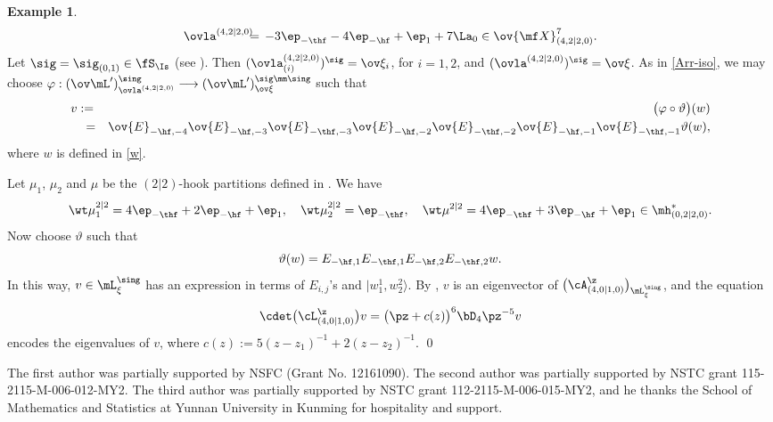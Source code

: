 \documentclass[11pt, reqno]{amsart}
\theoremstyle{definition}
\newtheorem{ex}[thm]{Example}
\theoremstyle{remark}
\numberwithin{equation}{section}
\begin{document}
\begin{ex}
\begin{eqnarray*}
\ovla^{(4,2|2,0)} \hspace{-2mm} &=& \hspace{-2mm} -3\ep_{-\thf}-4\ep_{-\hf}+\ep_1+7 \La_0 \in \ov{\mf X}^7_{(4,2|2,0)}.
\end{eqnarray*}
Let $\sig=\sig_{(0,1)} \in \fS_\Is$ (see ).
Then $(\ovla_{(i)}^{(4,2|2,0)})^\sig=\ov\xi_i$, for $i=1, 2$, and $(\ovla^{(4,2|2,0)})^\sig=\ov\xi$.
As in \eqref{Arr-iso}, we may choose $\varphi: (\ov\mL^\prime)_{\ovla^{(4,2|2,0)}}^\sing \longrightarrow (\ov\mL^\prime)_{\ov\xi}^{\sig\mm\sing}$ such that
\begin{eqnarray*}
v&:=& \big( \varphi \circ \vartheta \big) (w) \\
&\hspace{1.5mm}=& \ov{E}_{-\hf,-4} \ov{E}_{-\hf,-3}  \ov{E}_{-\thf,-3} \ov{E}_{-\hf,-2}  \ov{E}_{-\thf,-2}  \ov{E}_{-\hf,-1}  \ov{E}_{-\thf,-1} \vartheta (w),
\end{eqnarray*}
where $w$ is defined in \eqref{w}.

Let $\mu_1$, $\mu_2$ and $\mu$ be the $(2|2)$-hook partitions defined in . We have
$$
\wt\mu_1^{2|2}= 4 \ep_{-\thf}+2 \ep_{-\hf}+\ep_1, \quad \wt\mu_2^{2|2} = \ep_{-\thf}, \quad \wt\mu^{2|2} = 4\ep_{-\thf}+3\ep_{-\hf}+\ep_1 \in \mh_{(0,2|2,0)}^*.
$$
Now choose $\vartheta$ such that
$$
\vartheta (w)= E_{-\hf, 1} E_{-\thf, 1}  E_{-\hf, 2}  E_{-\thf, 2}   w.
$$
In this way, $v  \in \mL_{\xi}^\sing$ has an expression in terms of $E_{i,j}$'s and $\big|w_1^1, w_2^2 \big\rangle$.
By , $v$ is an eigenvector of $\big(\cA_{(4,0|1,0)}^\z\big)_{\mL^\sing_{\xi}}$, and the equation
$$
\cdet \big(\cL_{(4,0|1,0)}^\z \big) v
 = \big(\pz+c(z) \big)^{6}  \bD_4  \pz^{-5} v
$$
encodes the eigenvalues of $v$, where $c(z):=5 (z-z_1)^{-1}+2 (z-z_2)^{-1}$.
\qed
\end{ex}


\vspace{0.5cm}

The first author was partially supported by NSFC (Grant No. 12161090).
%
The second author was partially supported by NSTC grant 115-2115-M-006-012-MY2.
%
The third author was partially supported by NSTC grant 112-2115-M-006-015-MY2, and he thanks the School of Mathematics and Statistics at Yunnan University in Kunming for hospitality and support.


\bigskip
\frenchspacing
\end{document}

